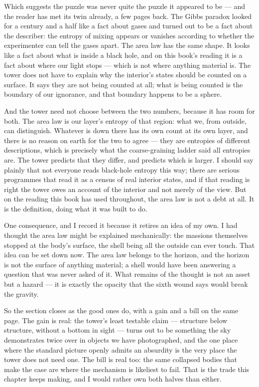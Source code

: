 Which suggests the puzzle was never quite the puzzle it appeared to be --- and the reader has met its twin already, a few pages back. The Gibbs paradox looked for a century and a half like a fact about gases and turned out to be a fact about the describer: the entropy of mixing appears or vanishes according to whether the experimenter can tell the gases apart. The area law has the same shape. It looks like a fact about what is inside a black hole, and on this book's reading it is a fact about where our light stops --- which is not where anything material is. The tower does not have to explain why the interior's states should be counted on a surface. It says they are not being counted at all; what is being counted is the boundary of our ignorance, and that boundary happens to be a sphere.

And the tower need not choose between the two numbers, because it has room for both. The area law is our layer's entropy of that region: what we, from outside, can distinguish. Whatever is down there has its own count at its own layer, and there is no reason on earth for the two to agree --- they are entropies of different descriptions, which is precisely what the coarse-graining ladder said all entropies are. The tower predicts that they differ, and predicts which is larger. I should say plainly that not everyone reads black-hole entropy this way; there are serious programmes that read it as a census of real interior states, and if that reading is right the tower owes an account of the interior and not merely of the view. But on the reading this book has used throughout, the area law is not a debt at all. It is the definition, doing what it was built to do.

One consequence, and I record it because it retires an idea of my own. I had thought the area law might be explained mechanically: the massions themselves stopped at the body's surface, the shell being all the outside can ever touch. That idea can be set down now. The area law belongs to the horizon, and the horizon is not the surface of anything material; a shell would have been answering a question that was never asked of it. What remains of the thought is not an asset but a hazard --- it is exactly the opacity that the sixth wound says would break the gravity.

So the section closes as the good ones do, with a gain and a bill on the same page. The gain is real: the tower's least testable claim --- structure below structure, without a bottom in sight --- turns out to be something the sky demonstrates twice over in objects we have photographed, and the one place where the standard picture openly admits an absurdity is the very place the tower does not need one. The bill is real too: the same collapsed bodies that make the case are where the mechanism is likeliest to fail. That is the trade this chapter keeps making, and I would rather own both halves than either.

